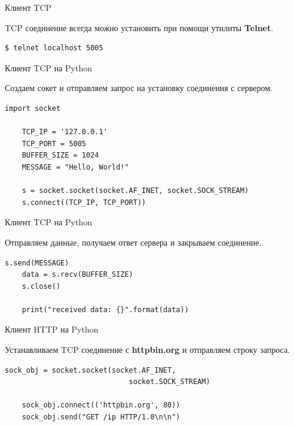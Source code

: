 \begin{frame}[fragile]{Клиент TCP}

    TCP соединение всегда можно установить при помощи утилиты \textbf{Telnet}.

    \begin{lstlisting}[style=python, caption=Telnet]
    $ telnet localhost 5005
    \end{lstlisting}
\end{frame}

\begin{frame}[fragile]{Клиент TCP на Python}

    Создаем сокет и отправляем запрос на установку соединения с сервером.

    \begin{lstlisting}[style=python, caption=Python]
    import socket

    TCP_IP = '127.0.0.1'
    TCP_PORT = 5005
    BUFFER_SIZE = 1024
    MESSAGE = "Hello, World!"

    s = socket.socket(socket.AF_INET, socket.SOCK_STREAM)
    s.connect((TCP_IP, TCP_PORT))
    \end{lstlisting}
\end{frame}

\begin{frame}[fragile]{Клиент TCP на Python}

    Отправляем данные, получаем ответ сервера и закрываем соединение.

    \begin{lstlisting}[style=python, caption=Python]
    s.send(MESSAGE)
    data = s.recv(BUFFER_SIZE)
    s.close()

    print("received data: {}".format(data))
    \end{lstlisting}
\end{frame}

\begin{frame}[fragile]{Клиент HTTP на Python}

    Устанавливаем TCP соединение с \textbf{httpbin.org} и отправляем строку
    запроса.

    \begin{lstlisting}[style=python, caption=Python]
    sock_obj = socket.socket(socket.AF_INET,
                             socket.SOCK_STREAM)

    sock_obj.connect(('httpbin.org', 80))
    sock_obj.send("GET /ip HTTP/1.0\n\n")
    \end{lstlisting}
\end{frame}


